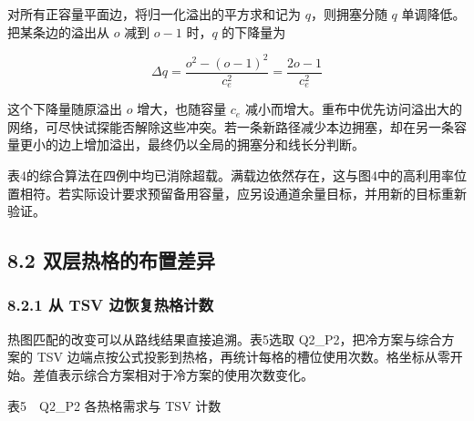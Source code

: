 \documentclass[12pt,a4paper]{article}
\begin{document}
对所有正容量平面边，将归一化溢出的平方求和记为 \(q\)，则拥塞分随 \(q\)
单调降低。把某条边的溢出从 \(o\) 减到 \(o-1\) 时，\(q\) 的下降量为

\begin{equation}
\Delta q=\frac{o^2-(o-1)^2}{c_e^2}=\frac{2o-1}{c_e^2}
\label{eq:delta}
\end{equation}

这个下降量随原溢出 \(o\) 增大，也随容量 \(c_e\)
减小而增大。重布中优先访问溢出大的网络，可尽快试探能否解除这些冲突。若一条新路径减少本边拥塞，却在另一条容量更小的边上增加溢出，最终仍以全局的拥塞分和线长分判断。

\begin{center}\fontsize{12}{14.4}\selectfont 表4的综合算法在四例中均已消除超载。满载边依然存在，这与图4中的高利用率位置相符。若实际设计要求预留备用容量，应另设通道余量目标，并用新的目标重新验证。\end{center}

\subsection{8.2
双层热格的布置差异}\label{ux53ccux5c42ux70edux683cux7684ux5e03ux7f6eux5deeux5f02}

\subsubsection{8.2.1 从 TSV
边恢复热格计数}\label{ux4ece-tsv-ux8fb9ux6062ux590dux70edux683cux8ba1ux6570}

热图匹配的改变可以从路线结果直接追溯。表5选取
Q2\_P2，把冷方案与综合方案的 TSV
边端点按公式投影到热格，再统计每格的槽位使用次数。格坐标从零开始。差值表示综合方案相对于冷方案的使用次数变化。

\begin{center}\fontsize{12}{14.4}\selectfont 表5　Q2\_P2 各热格需求与 TSV 计数\end{center}
\end{document}

